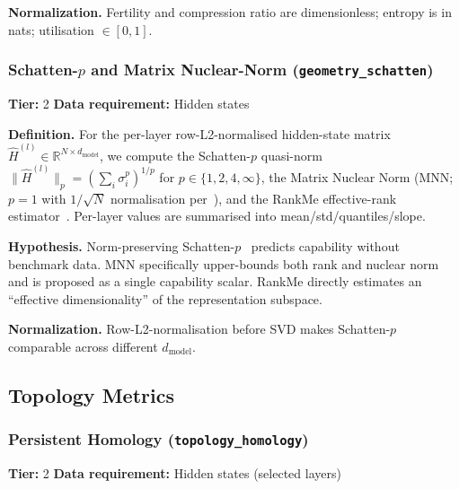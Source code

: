 \documentclass[preprint]{neurips_2025}
\begin{document}
\textbf{Normalization.} Fertility and compression ratio are dimensionless; entropy is in nats; utilisation $\in [0,1]$.

\subsubsection{Schatten-$p$ and Matrix Nuclear-Norm (\texttt{geometry\_schatten})}
\label{app:schatten}

\textbf{Tier:} 2 \quad \textbf{Data requirement:} Hidden states

\textbf{Definition.} For the per-layer row-L2-normalised hidden-state matrix $\hat H^{(l)} \in \mathbb{R}^{N \times d_{\text{model}}}$, we compute the Schatten-$p$ quasi-norm $\|\hat H^{(l)}\|_p = (\sum_i \sigma_i^p)^{1/p}$ for $p \in \{1, 2, 4, \infty\}$, the Matrix Nuclear Norm (MNN; $p=1$ with $1/\sqrt{N}$ normalisation per~\citet{li2024matrix}), and the RankMe effective-rank estimator~\citep{garrido2023rankme}. Per-layer values are summarised into mean/std/quantiles/slope.

\textbf{Hypothesis.} Norm-preserving Schatten-$p$~\citep{wei2025schatten} predicts capability without benchmark data. MNN specifically upper-bounds both rank and nuclear norm and is proposed as a single capability scalar. RankMe directly estimates an ``effective dimensionality'' of the representation subspace.

\textbf{Normalization.} Row-L2-normalisation before SVD makes Schatten-$p$ comparable across different $d_{\text{model}}$.

\subsection{Topology Metrics}
\label{app:topology}

\subsubsection{Persistent Homology (\texttt{topology\_homology})}
\label{app:homology}

\textbf{Tier:} 2 \quad \textbf{Data requirement:} Hidden states (selected layers)
\end{document}
